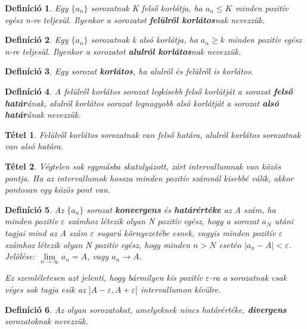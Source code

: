 \documentclass[12pt,a4paper]{article}
\newtheorem{theorem}{Tétel} [section]
\newtheorem{definition}{Definíció} [section]
\begin{document}
\begin{definition}
Egy $\{a_n\}$ sorozatnak K felső korlátja, ha $a_n \leq K$ minden pozitív egész n-re teljesül. Ilyenkor a sorozatot \textbf{felülről korlátos}nak nevezzük.
\end{definition}

\begin{definition}
Egy $\{a_n\}$ sorozatnak k alsó korlátja, ha $a_n \geq k$ minden pozitív egész n-re teljesül. Ilyenkor a sorozatot \textbf{alulról korlátos}nak nevezzük.
\end{definition}

\begin{definition}
 Egy sorozat \textbf{korlátos}, ha alulról és felülről is korlátos.
\end{definition}

\begin{definition}
A felülről korlátos sorozat legkisebb felső korlátját a sorozat \textbf{felső határ}ának, alulról korlátos sorozat legnagyobb alsó korlátját a sorozat \textbf{alsó határ}ának nevezzük.
\end{definition}

\begin{theorem}
 Felülről korlátos sorozatnak van felső határa, alulról korlátos sorozatnak van alsó határa.
\end{theorem}

\begin{theorem}
Végtelen sok egymásba skatulyázott, zárt intervallumnak van közös pontja. Ha az intervallumok hossza minden pozitív számnál kisebbé válik, akkor pontosan egy közös pont van.
\end{theorem}

\begin{definition}
Az $\{a_n\}$ sorozat \textbf{konvergens} és \textbf{határértéke} az A szám, ha minden pozitív $\varepsilon$ számhoz létezik olyan N pozitív egész, hogy a sorozat $a_N$ utáni tagjai mind az A szám $\varepsilon$ sugarú környezetébe esnek, vagyis minden pozitív $\varepsilon$ számhoz létezik olyan N pozitív egész, hogy minden $n > N$ esetén $|a_n - A|<\varepsilon$. Jelölése: $\lim\limits_{n \to \infty} a_n=A$, vagy $a_n \to A$.

Ez szemléletesen azt jelenti, hogy bármilyen kis pozitív $\varepsilon$-ra a sorozatnak csak véges sok tagja esik az $]A - \varepsilon, A + \varepsilon[$ intervallumon kívülre.
\end{definition}

\begin{definition}
Az olyan sorozatokat, amelyeknek nincs határértéke, \textbf{divergens} sorozatoknak nevezzük.
\end{definition}
\end{document}
